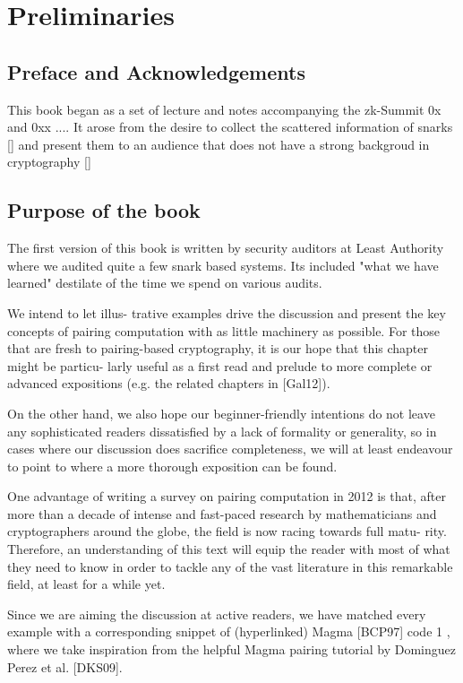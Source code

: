\chapter{Preliminaries}

\section{Preface and Acknowledgements}
This book began as a set of lecture and notes accompanying the zk-Summit 0x and 0xx .... It arose from the desire to collect the scattered information of snarks [] and present them to an audience that does not have a strong backgroud in cryptography []

\section{Purpose of the book}
The first version of this book is written by security auditors at Least Authority where we audited quite a few snark based systems. Its included "what we have learned" destilate of the time we spend on various audits.  


We intend to let illus-
trative examples drive the discussion and present the key concepts of pairing
computation with as little machinery as possible. For those that are fresh to
pairing-based cryptography, it is our hope that this chapter might be particu-
larly useful as a first read and prelude to more complete or advanced expositions
(e.g. the related chapters in [Gal12]).

On the other hand, we also hope our beginner-friendly intentions do not leave
any sophisticated readers dissatisfied by a lack of formality or generality, so in
cases where our discussion does sacrifice completeness, we will at least endeavour
to point to where a more thorough exposition can be found.

One advantage of writing a survey on pairing computation in 2012 is that,
after more than a decade of intense and fast-paced research by mathematicians
and cryptographers around the globe, the field is now racing towards full matu-
rity. Therefore, an understanding of this text will equip the reader with most
of what they need to know in order to tackle any of the vast literature in this
remarkable field, at least for a while yet.

Since we are aiming the discussion at
active readers, we have matched every example with a corresponding snippet of
(hyperlinked) Magma [BCP97] code 1 , where we take inspiration from the helpful
Magma pairing tutorial by Dominguez Perez et al. [DKS09].


